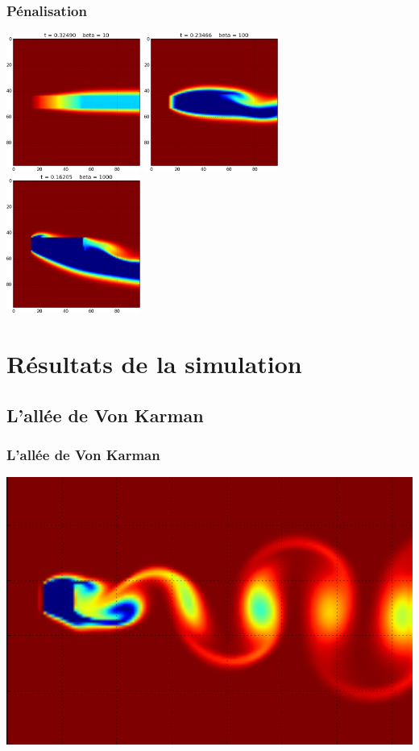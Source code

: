 \documentclass{beamer}
\begin{document}
  \begin{frame}
    \frametitle{Pénalisation}
    \begin{center}
      \includegraphics[width=0.33\textwidth]{penalisation_10.png}
      \includegraphics[width=0.33\textwidth]{penalisation_100.png}
      \includegraphics[width=0.33\textwidth]{penalisation_1000.png}
    \end{center}
  \end{frame}
\section{Résultats de la simulation}

 \subsection{L'allée de Von Karman}
 \begin{frame}
   \frametitle{L'allée de Von Karman}
   \centering \includegraphics[height= 0.7 \textheight]{VK_pas_mal.png}	
 \end{frame}
 
\end{document}
